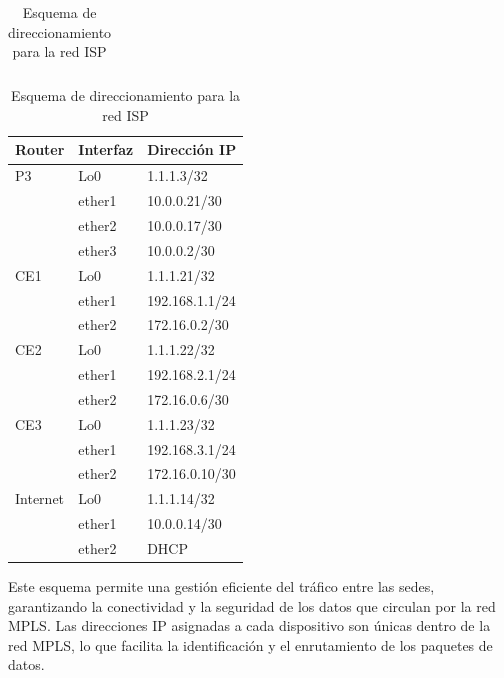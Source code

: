 \begin{table}[H]
\begin{subtable}[b]{0.475\textwidth}
\begin{tabular}{|l|l|l|}
		\end{tabular}
	\end{subtable}
	\hfill
	\begin{subtable}[b]{0.475\textwidth}
		\centering
		\begin{tabular}{|l|l|l|}
			\hline
			\textbf{Router} & \textbf{Interfaz} & \textbf{Dirección IP} \\ \hline
			P3              & Lo0               & 1.1.1.3/32            \\ \cline{2-3}
			                & ether1            & 10.0.0.21/30          \\ \cline{2-3}
			                & ether2            & 10.0.0.17/30          \\ \cline{2-3}
			                & ether3            & 10.0.0.2/30           \\ \hline
			CE1             & Lo0               & 1.1.1.21/32           \\ \cline{2-3}
			                & ether1            & 192.168.1.1/24        \\ \cline{2-3}
			                & ether2            & 172.16.0.2/30         \\ \hline
			CE2             & Lo0               & 1.1.1.22/32           \\ \cline{2-3}
			                & ether1            & 192.168.2.1/24        \\ \cline{2-3}
			                & ether2            & 172.16.0.6/30         \\ \hline
			CE3             & Lo0               & 1.1.1.23/32           \\ \cline{2-3}
			                & ether1            & 192.168.3.1/24        \\ \cline{2-3}
			                & ether2            & 172.16.0.10/30        \\ \hline
			Internet        & Lo0               & 1.1.1.14/32           \\ \cline{2-3}
			                & ether1            & 10.0.0.14/30          \\ \cline{2-3}
			                & ether2            & DHCP                  \\ \hline
		\end{tabular}
	\end{subtable}
	\caption{Esquema de direccionamiento para la red ISP}
	\label{tab:esquema_direccionamiento_isp}
\end{table}

Este esquema permite una gestión eficiente del tráfico entre las sedes,
garantizando la conectividad y la seguridad de los datos que circulan por la
red MPLS. Las direcciones IP asignadas a cada dispositivo son únicas dentro de
la red MPLS, lo que facilita la identificación y el enrutamiento de los
paquetes de datos.

